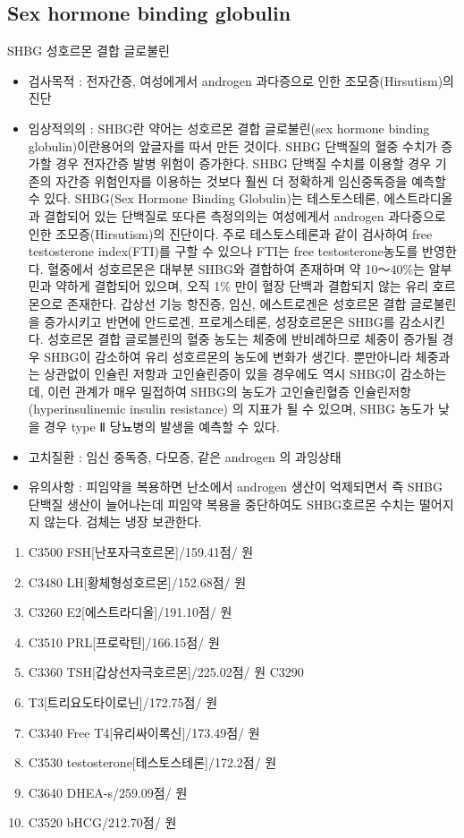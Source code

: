 \subsection{Sex hormone binding globulin}
SHBG 성호르몬 결합 글로불린 
\begin{itemize}[◉]\tightlist
\item 검사목적 : 전자간증, 여성에게서 androgen 과다증으로 인한 조모증(Hirsutism)의 진단 
\item 임상적의의 : SHBG란 약어는 성호르몬 결합 글로불린(sex hormone binding globulin)이란용어의 앞글자를 따서 만든 것이다. SHBG 단백질의 혈중 수치가 증가할 경우 전자간증 발병 위험이 증가한다. SHBG 단백질 수치를 이용할 경우 기존의 자간증 위험인자를 이용하는 것보다 훨씬 더 정확하게 임신중독증을 예측할 수 있다. SHBG(Sex Hormone Binding Globulin)는 테스토스테론, 에스트라디올과 결합되어 있는 단백질로 또다른 측정의의는 여성에게서 androgen 과다증으로 인한 조모증(Hirsutism)의 진단이다. 주로 테스토스테론과 같이 검사하여 free testosterone index(FTI)를 구할 수 있으나 FTI는 free testosterone농도를 반영한다. 혈중에서 성호르몬은 대부분 SHBG와 결합하여 존재하며 약 10〜40\%는 알부민과 약하게 결합되어 있으며, 오직 1\% 만이 혈장 단백과 결합되지 않는 유리 호르몬으로 존재한다. 갑상선 기능 항진증, 임신, 에스트로겐은 성호르몬 결합 글로불린을 증가시키고 반면에 안드로겐, 프로게스테론, 성장호르몬은 SHBG를 감소시킨다. 성호르몬 결합 글로블린의 혈중 농도는 체중에 반비례하므로 체중이 증가될 경우 SHBG이 감소하여 유리 성호르몬의 농도에 변화가 생긴다. 뿐만아니라 체중과는 상관없이 인슐린 저항과 고인슐린증이 있을 경우에도 역시 SHBG이 감소하는데, 이런 관계가 매우 밀접하여 SHBG의 농도가 고인슐린혈증 인슐린저항 (hyperinsulinemic insulin resistance) 의 지표가 될 수 있으며, SHBG 농도가 낮을 경우 type Ⅱ 당뇨병의 발생을 예측할 수 있다. 
\item 고치질환 : 임신 중독증, 다모증, 같은 androgen 의 과잉상태 
\item 유의사항 : 피임약을 복용하면 난소에서 androgen 생산이 억제되면서 즉 SHBG 단백질 생산이 늘어나는데 피임약 복용을 중단하여도 SHBG호르몬 수치는 떨어지지 않는다. 검체는 냉장 보관한다. 
\end{itemize}
\begin{enumerate}\tightlist
\item C3500 FSH[난포자극호르몬]/159.41점/ 원
\item C3480 LH[황체형성호르몬]/152.68점/ 원
\item C3260 E2[에스트라디올]/191.10점/ 원
\item C3510 PRL[프로락틴]/166.15점/ 원
\item C3360 TSH[갑상선자극호르몬]/225.02점/ 원 C3290 
\item T3[트리요도타이로닌]/172.75점/ 원
\item C3340 Free T4[유리싸이록신]/173.49점/ 원
\item C3530 testosterone[테스토스테론]/172.2점/ 원
\item C3640 DHEA-s/259.09점/ 원
\item C3520 bHCG/212.70점/ 원
\end{enumerate}